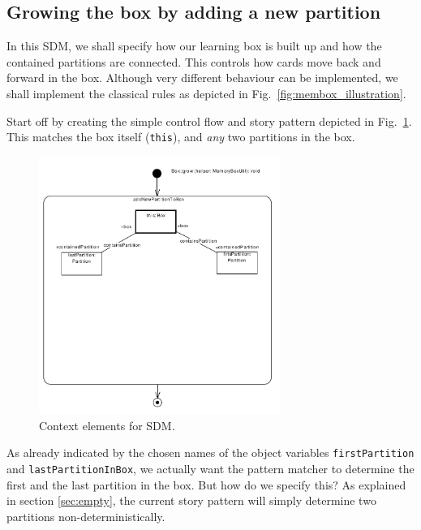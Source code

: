 \subsection{Growing the box by adding a new partition}
\label{sec:sdm_grow}	
	
In this SDM, we shall specify how our learning box is built up and how the
contained partitions are connected.  This controls how cards move back and
forward in the box.  Although very different behaviour can be implemented, we
shall implement the classical rules as depicted in
Fig.~\ref{fig:membox_illustration}.

Start off by creating the simple control flow and story pattern depicted in
Fig.~\ref{fig:sdm_grow_1}.  This matches the box itself (\texttt{this}), and
\emph{any} two partitions in the box.
	
\begin{figure}[htp]
\begin{center}
  \includegraphics[width=0.7\textwidth]{pics/sdmBilder/grow/sdm57.pdf}
  \caption{Context elements for SDM.}  
  \label{fig:sdm_grow_1}
\end{center}
\end{figure}

As already indicated by the chosen names of the object variables
\texttt{first\-Partition} and \texttt{last\-Partition\-In\-Box}, we actually
want the pattern matcher to determine the first and the last partition in the box.
But how do we specify this?  As explained in section \ref{sec:empty}, the
current story pattern will simply determine two partitions
non-deterministically.  

